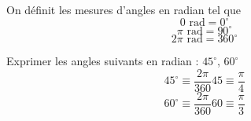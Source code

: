 On définit les mesures d'angles en radian tel que 
$$0 \text{ rad} = 0^{\circ}$$
$$\pi \text{ rad} = 90^{\circ}$$
$$2\pi \text{ rad} = 360^{\circ}$$
\newline
\begin{exemple}
Exprimer les angles suivants en radian : $45^{\circ}$, $60^{\circ}$
$$45^{\circ} \equiv \dfrac{2\pi}{360} 45 \equiv \dfrac{\pi}{4}$$
$$60^{\circ} \equiv \dfrac{2\pi}{360} 60 \equiv \dfrac{\pi}{3}$$
\end{exemple}
